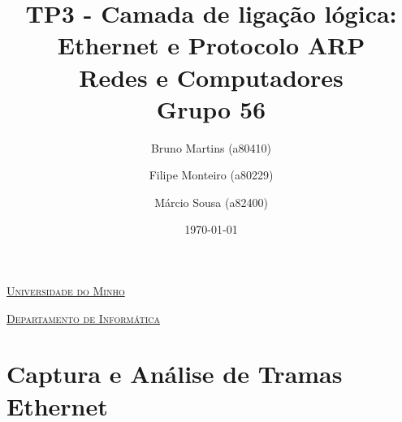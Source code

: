 \documentclass[a4paper]{article}
\begin{document}
\title{TP3 - Camada de ligação lógica: Ethernet e Protocolo ARP\\ Redes e Computadores\\Grupo 56}
\author{Bruno Martins (a80410) \and Filipe Monteiro (a80229) \and Márcio Sousa (a82400)}
\date{\today}

\begin{titlepage}

  \thispagestyle{empty}
  \begin{center}
  \begin{minipage}{0.75\linewidth}
      \centering
      \vspace{1.5cm}
      \href{https://www.uminho.pt/PT}{\scshape\LARGE Universidade do Minho} \par
      \vspace{1cm}
      \href{https://www.di.uminho.pt/}{\scshape\Large Departamento de Informática} \par
      \vspace{1.5cm}

  \maketitle
  \end{minipage}
  \end{center}

  \vspace{2cm}

  


  \clearpage

 \end{titlepage}
 \tableofcontents
 
 \section{Captura e Análise de Tramas Ethernet}
\end{document}
